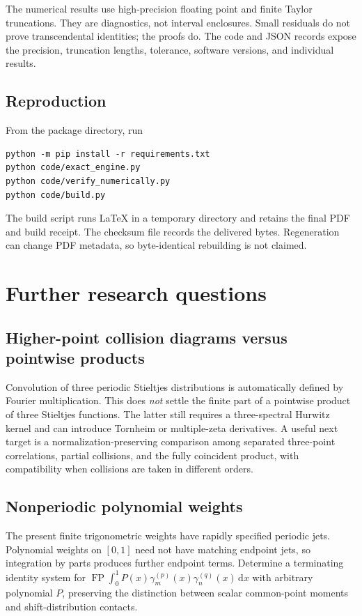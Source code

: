 \documentclass[11pt,a4paper]{article}
\numberwithin{equation}{section}
\theoremstyle{definition}
\newcommand{\dd}{\,\mathrm dx}
\newcommand{\FP}{\operatorname{FP}}
\begin{document}
The numerical results use high-precision floating point and finite Taylor truncations. They are diagnostics, not interval enclosures. Small residuals do not prove transcendental identities; the proofs do. The code and JSON records expose the precision, truncation lengths, tolerance, software versions, and individual results.

\subsection{Reproduction}
From the package directory, run
\begin{verbatim}
python -m pip install -r requirements.txt
python code/exact_engine.py
python code/verify_numerically.py
python code/build.py
\end{verbatim}
The build script runs \LaTeX{} in a temporary directory and retains the final PDF and build receipt. The checksum file records the delivered bytes. Regeneration can change PDF metadata, so byte-identical rebuilding is not claimed.

\section{Further research questions}\label{pc:further}
\subsection{Higher-point collision diagrams versus pointwise products}
Convolution of three periodic Stieltjes distributions is automatically defined by Fourier multiplication. This does \emph{not} settle the finite part of a pointwise product of three Stieltjes functions. The latter still requires a three-spectral Hurwitz kernel and can introduce Tornheim or multiple-zeta derivatives. A useful next target is a normalization-preserving comparison among separated three-point correlations, partial collisions, and the fully coincident product, with compatibility when collisions are taken in different orders.

\subsection{Nonperiodic polynomial weights}
The present finite trigonometric weights have rapidly specified periodic jets. Polynomial weights on $[0,1]$ need not have matching endpoint jets, so integration by parts produces further endpoint terms. Determine a terminating identity system for
$\FP\int_0^1P(x)\gamma_m^{(p)}(x)\gamma_n^{(q)}(x)\dd$ with arbitrary polynomial $P$, preserving the distinction between scalar common-point moments and shift-distribution contacts.
\end{document}
